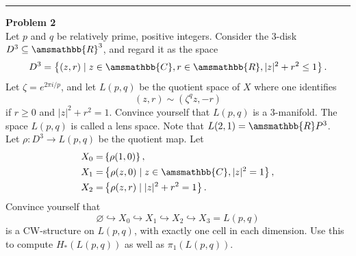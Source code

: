 \documentclass[a4paper, 12pt]{article}
\newenvironment{problem}[2][Problem]
    { \begin{mdframed}[backgroundcolor=gray!20] \textbf{#1 #2} \\}
    {  \end{mdframed}}
\renewcommand{\mathbb}{\amsmathbb}
\begin{document}
\noindent\rule{7in}{2.8pt}
\begin{problem}{2}
Let \(p\) and \(q\) be relatively prime, positive integers. Consider the \(3\)-disk \(D^3\subseteq \mathbb{R}^3\), and regard it as the space 
\[D^3=\left\{ (z,r)\mid z\in \mathbb{C}, r\in \mathbb{R}, |z|^2+r^2\leq 1\right\}.\]
Let  \(\zeta=e^{2\pi i/p}\), and let \(L(p,q)\) be the quotient space of \(X\) where one identifies 
\[(z,r)\sim (\zeta^qz,-r)\]
if \(r\geq 0\) and \(|z|^2+r^2=1\). Convince yourself that \(L(p,q)\) is a 3-manifold. The space \(L(p,q)\) is called a lens space. Note that \(L(2,1)=\mathbb{R}P^3\). \\ 
Let \(\rho:D^3\rightarrow L(p,q)\) be the quotient map. Let 
\begin{align*}
    X_0=&\left\{ \rho(1,0) \right\},\\ 
    X_1=&\left\{ \rho(z,0)\mid z\in \mathbb{C},|z|^2=1 \right\},\\ 
    X_2=&\left\{ \rho(z,r)\mid |z|^2+r^2=1 \right\}.
\end{align*}
Convince yourself that 
\[\varnothing \hookrightarrow X_0\hookrightarrow X_1\hookrightarrow X_2\hookrightarrow X_3=L(p,q)\]
 is a CW-structure on \(L(p,q)\), with exactly one cell in each dimension. Use this to compute \(H_*(L(p,q))\) as well as \(\pi_1(L(p,q))\).
\end{problem}
\end{document}
